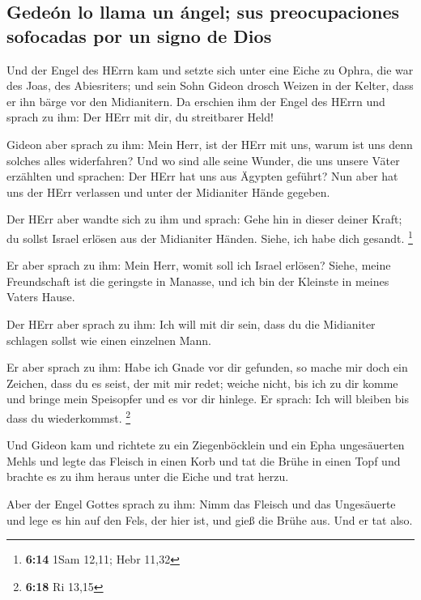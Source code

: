 \hypertarget{gedeuxf3n-lo-llama-un-uxe1ngel-sus-preocupaciones-sofocadas-por-un-signo-de-dios}{%
\subsection{Gedeón lo llama un ángel; sus preocupaciones sofocadas por
un signo de
Dios}\label{gedeuxf3n-lo-llama-un-uxe1ngel-sus-preocupaciones-sofocadas-por-un-signo-de-dios}}

 Und der Engel des HErrn kam und setzte sich unter eine
Eiche zu Ophra, die war des Joas, des Abiesriters; und sein Sohn Gideon
drosch Weizen in der Kelter, dass er ihn bärge vor den Midianitern.
 Da erschien ihm der Engel des HErrn und sprach zu ihm:
Der HErr mit dir, du streitbarer Held!

 Gideon aber sprach zu ihm: Mein Herr, ist der HErr mit
uns, warum ist uns denn solches alles widerfahren? Und wo sind alle
seine Wunder, die uns unsere Väter erzählten und sprachen: Der HErr hat
uns aus Ägypten geführt? Nun aber hat uns der HErr verlassen und unter
der Midianiter Hände gegeben.

 Der HErr aber wandte sich zu ihm und sprach: Gehe hin in
dieser deiner Kraft; du sollst Israel erlösen aus der Midianiter Händen.
Siehe, ich habe dich gesandt. \footnote{\textbf{6:14} 1Sam 12,11; Hebr
  11,32}

 Er aber sprach zu ihm: Mein Herr, womit soll ich Israel
erlösen? Siehe, meine Freundschaft ist die geringste in Manasse, und ich
bin der Kleinste in meines Vaters Hause.

 Der HErr aber sprach zu ihm: Ich will mit dir sein, dass
du die Midianiter schlagen sollst wie einen einzelnen Mann.

 Er aber sprach zu ihm: Habe ich Gnade vor dir gefunden,
so mache mir doch ein Zeichen, dass du es seist, der mit mir redet;
 weiche nicht, bis ich zu dir komme und bringe mein
Speisopfer und es vor dir hinlege. Er sprach: Ich will bleiben bis dass
du wiederkommst. \footnote{\textbf{6:18} Ri 13,15}

 Und Gideon kam und richtete zu ein Ziegenböcklein und
ein Epha ungesäuerten Mehls und legte das Fleisch in einen Korb und tat
die Brühe in einen Topf und brachte es zu ihm heraus unter die Eiche und
trat herzu.

 Aber der Engel Gottes sprach zu ihm: Nimm das Fleisch
und das Ungesäuerte und lege es hin auf den Fels, der hier ist, und gieß
die Brühe aus. Und er tat also.

